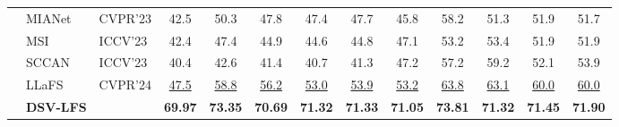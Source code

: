 \begin{table}[ht!]
{\begin{tabular}{@{}p{1.5cm}|p{2.5cm}|p{1.7cm}|c |c |c |c ||c| c |c |c |c ||c@{}}
& MIANet \cite{yang2023mianet} & CVPR'23 & 42.5 & 50.3 & 47.8 & 47.4 & 47.7 & 45.8 & 58.2 & 51.3 & 51.9 & 51.7 \\
& MSI \cite{moon2023msi} & ICCV'23 & 42.4 & 47.4 & 44.9 & 44.6 & 44.8 & 47.1 & 53.2 & 53.4 & 51.9 & 51.9 \\
& SCCAN \cite{xu2023self} & ICCV'23 & 40.4 & 42.6 & 41.4 & 40.7 & 41.3 & 47.2 & 57.2 & 59.2 & 52.1 & 53.9 \\
& LLaFS \cite{zhu2023llafs}& CVPR’24 & \underline{47.5} & \underline{58.8} & \underline{56.2} & \underline{53.0} & \underline{53.9} & \underline{53.2} & \underline{63.8} & \underline{63.1} & \underline{60.0} & \underline{60.0} \\
\rowcolor[HTML]{D9EAD3}
& \textbf{DSV-LFS} &  & \textbf{69.97} & \textbf{73.35} & \textbf{70.69} & \textbf{71.32} &\cellcolor[gray]{0.7} \textbf{71.33} & \textbf{71.05} & \textbf{73.81} & \textbf{71.32} & \textbf{71.45} & \cellcolor[gray]{0.7} \textbf{71.90} \\
\bottomrule
\end{tabular}}%
\label{tab:performance_comparison}
\end{table}
